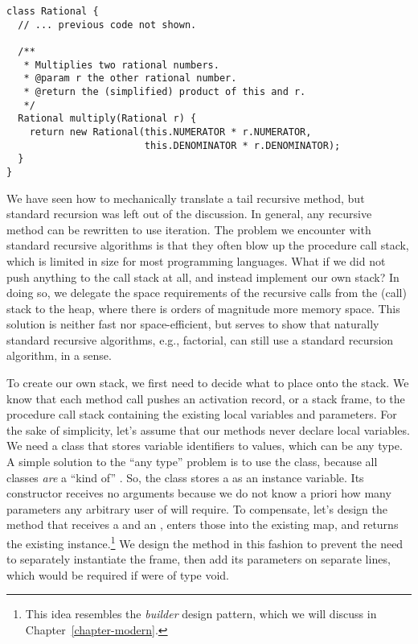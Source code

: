 \begin{lstlisting}[language=MyJava]
class Rational {
  // ... previous code not shown.

  /**
   * Multiplies two rational numbers.
   * @param r the other rational number.
   * @return the (simplified) product of this and r.
   */
  Rational multiply(Rational r) {
    return new Rational(this.NUMERATOR * r.NUMERATOR, 
                        this.DENOMINATOR * r.DENOMINATOR);
  }
}
\end{lstlisting}

We have seen how to mechanically translate a tail recursive method, but standard recursion was left out of the discussion. 
In general, any recursive method can be rewritten to use iteration. 
The problem we encounter with standard recursive algorithms is that they often blow up the procedure call stack, which is limited in size for most programming languages. 
What if we did not push anything to the call stack at all, and instead implement our own stack? 
In doing so, we delegate the space requirements of the recursive calls from the (call) stack to the heap, where there is orders of magnitude more memory space. This solution is neither fast nor space-efficient, but serves to show that naturally standard recursive algorithms, e.g., factorial, can still use a standard recursion algorithm, in a sense.

To create our own stack, we first need to decide what to place onto the stack. 
We know that each method call pushes an activation record, or a stack frame, to the procedure call stack containing the existing local variables and parameters. 
For the sake of simplicity, let's assume that our methods never declare local variables. 
We need a class that stores variable identifiers to values, which can be any type. 
A simple solution to the ``any type'' problem is to use the  class, because all classes \emph{are} a ``kind of'' . 
So, the  class stores a  as an instance variable. 
Its constructor receives no arguments because we do not know a priori how many parameters any arbitrary user of  will require. 
To compensate, let's design the  method that receives a  and an , enters those into the existing map, and returns the existing instance.\footnote{This idea resembles the \emph{builder} design pattern, which we will discuss in Chapter~\ref{chapter-modern}.} We design the method in this fashion to prevent the need to separately instantiate the frame, then add its parameters on separate lines, which would be required if  were of type void.

